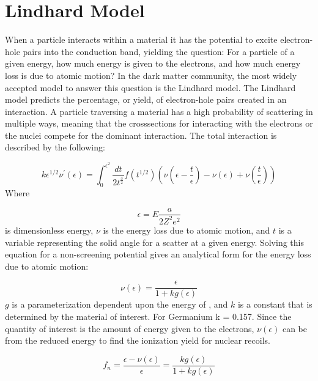 \section{Lindhard Model} 

When a particle interacts within a material it has the potential to excite electron-hole pairs into the conduction band, yielding the question: For a particle of a given energy, how much energy is given to the electrons, and how much energy loss is due to atomic motion? In the dark matter community, the most widely accepted model to answer this question is the Lindhard model. The Lindhard model predicts the percentage, or yield, of electron-hole pairs created in an interaction. A particle traversing a material has a high probability of scattering in multiple ways, meaning that the crosssections for interacting with the electrons or the nuclei compete for the dominant interaction. The total interaction is described by the following: \cite{Lindhard_3}



\begin{equation}
k \epsilon^{1/2}\nu^{'}(\epsilon) = \int_{0}^{\epsilon^{2}} \frac{dt}{2t^{\frac{3}{2}}}f(t^{1/2})(\nu(\epsilon -\frac{t}{\epsilon}) - \nu(\epsilon)+\nu(\frac{t}{\epsilon}))
\end{equation}
\noindent
Where

\begin{equation}
\epsilon = E\frac{a}{2Z^2e^2}
\end{equation}
is dimensionless energy, $\nu$ is the energy loss due to atomic motion, and $t$ is a variable representing the solid angle for a scatter at a given energy. Solving this equation for a non-screening potential gives an analytical form for the energy loss due to atomic motion:\cite{sorensen_atomic_2015} 

\begin{equation}
\nu(\epsilon) = \frac{\epsilon}{1+kg(\epsilon)}
\end{equation}
$g$ is a parameterization dependent upon the energy of , and $k$ is a constant that is determined by the material of interest. For Germanium k = 0.157. Since the quantity of interest is the amount of energy given to the electrons, $\nu(\epsilon)$ can be from the reduced energy to find the ionization yield for nuclear recoils. 


\begin{equation}
f_n = \frac{\epsilon - \nu(\epsilon)}{\epsilon} = \frac{kg(\epsilon)}{1+kg(\epsilon)}
\end{equation}




